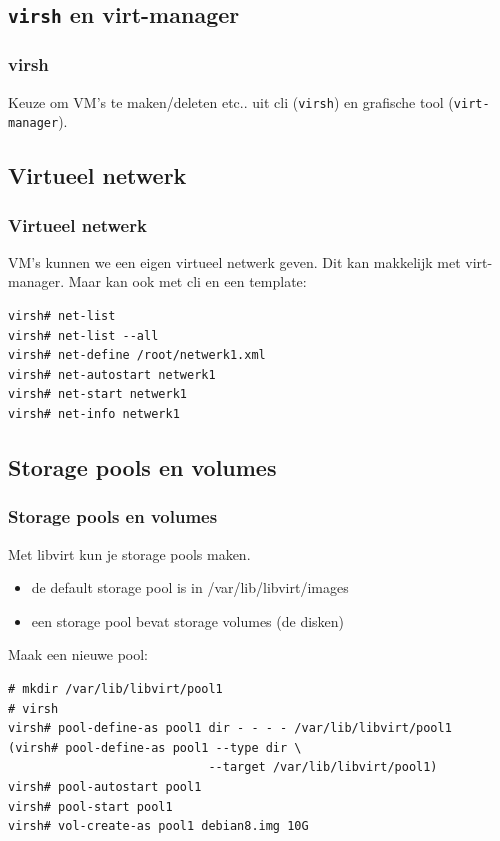 \subsection {{\tt virsh} en virt-manager}
\begin{styleframe}
    \frametitle{virsh}
Keuze om VM's te maken/deleten etc.. uit cli ({\tt virsh}) en grafische tool ({\tt virt-manager}).
\end{styleframe}

\subsection {Virtueel netwerk}
\begin{styleframefrag}
    \frametitle{Virtueel netwerk}
VM's kunnen we een eigen virtueel netwerk geven.
Dit kan makkelijk met virt-manager.
Maar kan ook met cli en een template:
\pause
\scriptsize
\begin{verbatim}
virsh# net-list
virsh# net-list --all
virsh# net-define /root/netwerk1.xml
virsh# net-autostart netwerk1
virsh# net-start netwerk1
virsh# net-info netwerk1
\end{verbatim}
\end{styleframefrag}

\subsection{Storage pools en volumes}
\begin{styleframefrag}
    \frametitle{Storage pools en volumes}
Met libvirt kun je storage pools maken.
\begin{itemize}
	\item de default storage pool is in /var/lib/libvirt/images
	\item een storage pool bevat storage volumes (de disken)
\end{itemize}
Maak een nieuwe pool:
\scriptsize
\begin{verbatim}
# mkdir /var/lib/libvirt/pool1
# virsh
virsh# pool-define-as pool1 dir - - - - /var/lib/libvirt/pool1
(virsh# pool-define-as pool1 --type dir \
                            --target /var/lib/libvirt/pool1)
virsh# pool-autostart pool1
virsh# pool-start pool1
virsh# vol-create-as pool1 debian8.img 10G                                                                                   
\end{verbatim}
\end{styleframefrag}

